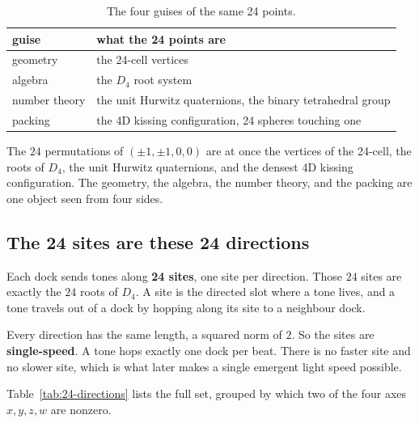 \begin{table}[ht]
\centering
\begin{tabular}{@{}ll@{}}
\toprule
guise & what the 24 points are \\
\midrule
geometry & the 24-cell vertices \\
algebra & the $D_4$ root system \\
number theory & the unit Hurwitz quaternions, the binary tetrahedral group \\
packing & the 4D kissing configuration, 24 spheres touching one \\
\bottomrule
\end{tabular}
\caption{The four guises of the same 24 points.}
\label{tab:24cell-guises}
\end{table}

\begin{result}
The $24$ permutations of $(\pm 1, \pm 1, 0, 0)$ are at once the vertices of the 24-cell, the roots of $D_4$, the unit Hurwitz quaternions, and the densest 4D kissing configuration. The geometry, the algebra, the number theory, and the packing are one object seen from four sides.
\end{result}

\subsection{The 24 sites are these 24 directions}

Each dock sends tones along \textbf{24 sites}, one site per direction. Those $24$ sites are exactly the $24$ roots of $D_4$. A site is the directed slot where a tone lives, and a tone travels out of a dock by hopping along its site to a neighbour dock.

Every direction has the same length, a squared norm of $2$. So the sites are \textbf{single-speed}. A tone hops exactly one dock per beat. There is no faster site and no slower site, which is what later makes a single emergent light speed possible.

Table~\ref{tab:24-directions} lists the full set, grouped by which two of the four axes $x, y, z, w$ are nonzero.

